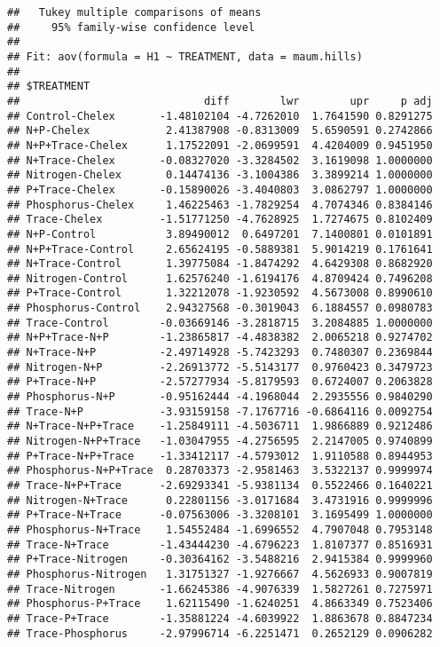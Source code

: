 \documentclass[]{article}
\begin{document}
\begin{verbatim}
##   Tukey multiple comparisons of means
##     95% family-wise confidence level
## 
## Fit: aov(formula = H1 ~ TREATMENT, data = maum.hills)
## 
## $TREATMENT
##                             diff        lwr        upr     p adj
## Control-Chelex       -1.48102104 -4.7262010  1.7641590 0.8291275
## N+P-Chelex            2.41387908 -0.8313009  5.6590591 0.2742866
## N+P+Trace-Chelex      1.17522091 -2.0699591  4.4204009 0.9451950
## N+Trace-Chelex       -0.08327020 -3.3284502  3.1619098 1.0000000
## Nitrogen-Chelex       0.14474136 -3.1004386  3.3899214 1.0000000
## P+Trace-Chelex       -0.15890026 -3.4040803  3.0862797 1.0000000
## Phosphorus-Chelex     1.46225463 -1.7829254  4.7074346 0.8384146
## Trace-Chelex         -1.51771250 -4.7628925  1.7274675 0.8102409
## N+P-Control           3.89490012  0.6497201  7.1400801 0.0101891
## N+P+Trace-Control     2.65624195 -0.5889381  5.9014219 0.1761641
## N+Trace-Control       1.39775084 -1.8474292  4.6429308 0.8682920
## Nitrogen-Control      1.62576240 -1.6194176  4.8709424 0.7496208
## P+Trace-Control       1.32212078 -1.9230592  4.5673008 0.8990610
## Phosphorus-Control    2.94327568 -0.3019043  6.1884557 0.0980783
## Trace-Control        -0.03669146 -3.2818715  3.2084885 1.0000000
## N+P+Trace-N+P        -1.23865817 -4.4838382  2.0065218 0.9274702
## N+Trace-N+P          -2.49714928 -5.7423293  0.7480307 0.2369844
## Nitrogen-N+P         -2.26913772 -5.5143177  0.9760423 0.3479723
## P+Trace-N+P          -2.57277934 -5.8179593  0.6724007 0.2063828
## Phosphorus-N+P       -0.95162444 -4.1968044  2.2935556 0.9840290
## Trace-N+P            -3.93159158 -7.1767716 -0.6864116 0.0092754
## N+Trace-N+P+Trace    -1.25849111 -4.5036711  1.9866889 0.9212486
## Nitrogen-N+P+Trace   -1.03047955 -4.2756595  2.2147005 0.9740899
## P+Trace-N+P+Trace    -1.33412117 -4.5793012  1.9110588 0.8944953
## Phosphorus-N+P+Trace  0.28703373 -2.9581463  3.5322137 0.9999974
## Trace-N+P+Trace      -2.69293341 -5.9381134  0.5522466 0.1640221
## Nitrogen-N+Trace      0.22801156 -3.0171684  3.4731916 0.9999996
## P+Trace-N+Trace      -0.07563006 -3.3208101  3.1695499 1.0000000
## Phosphorus-N+Trace    1.54552484 -1.6996552  4.7907048 0.7953148
## Trace-N+Trace        -1.43444230 -4.6796223  1.8107377 0.8516931
## P+Trace-Nitrogen     -0.30364162 -3.5488216  2.9415384 0.9999960
## Phosphorus-Nitrogen   1.31751327 -1.9276667  4.5626933 0.9007819
## Trace-Nitrogen       -1.66245386 -4.9076339  1.5827261 0.7275971
## Phosphorus-P+Trace    1.62115490 -1.6240251  4.8663349 0.7523406
## Trace-P+Trace        -1.35881224 -4.6039922  1.8863678 0.8847234
## Trace-Phosphorus     -2.97996714 -6.2251471  0.2652129 0.0906282
\end{verbatim}
\end{document}

